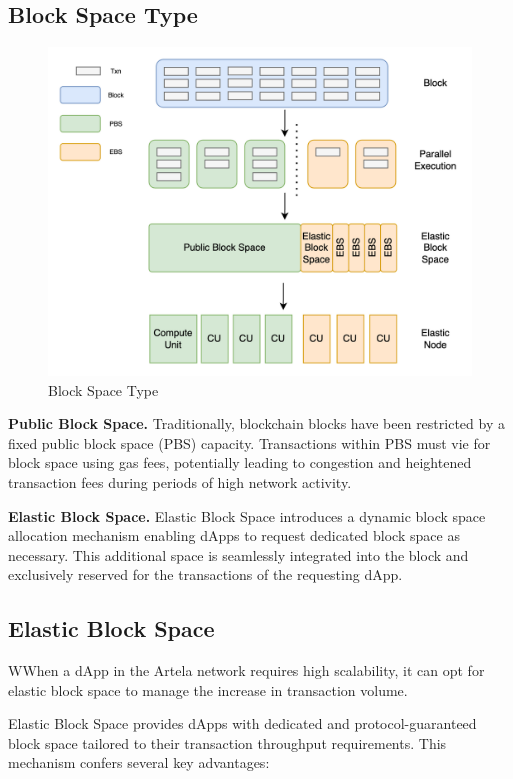 \subsection{Block Space Type}

\begin{figure}[htp]
\centering
\includegraphics[width=\columnwidth]{sections/images/elastic-block-space.png}
\caption{Block Space Type}
\end{figure}

\textbf{Public Block Space.} Traditionally, blockchain blocks have been restricted by a fixed public block space (PBS) capacity. Transactions within PBS must vie for block space using gas fees, potentially leading to congestion and heightened transaction fees during periods of high network activity.

\textbf{Elastic Block Space.} Elastic Block Space introduces a dynamic block space allocation mechanism enabling dApps to request dedicated block space as necessary. This additional space is seamlessly integrated into the block and exclusively reserved for the transactions of the requesting dApp.

\subsection{Elastic Block Space}

WWhen a dApp in the Artela network requires high scalability, it can opt for elastic block space to manage the increase in transaction volume.

Elastic Block Space provides dApps with dedicated and protocol-guaranteed block space tailored to their transaction throughput requirements. This mechanism confers several key advantages:

